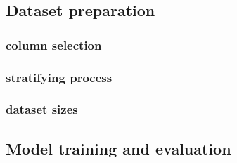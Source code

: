 \documentclass[
  letterpaper,
  DIV=11,
  numbers=noendperiod]{scrartcl}
\begin{document}
\newpage

\subsection{Dataset preparation}\label{dataset-preparation}

\subsubsection{column selection}\label{column-selection}

\subsubsection{stratifying process}\label{stratifying-process}

\subsubsection{dataset sizes}\label{dataset-sizes}

\newpage

\subsection{Model training and
evaluation}\label{model-training-and-evaluation}
\end{document}
